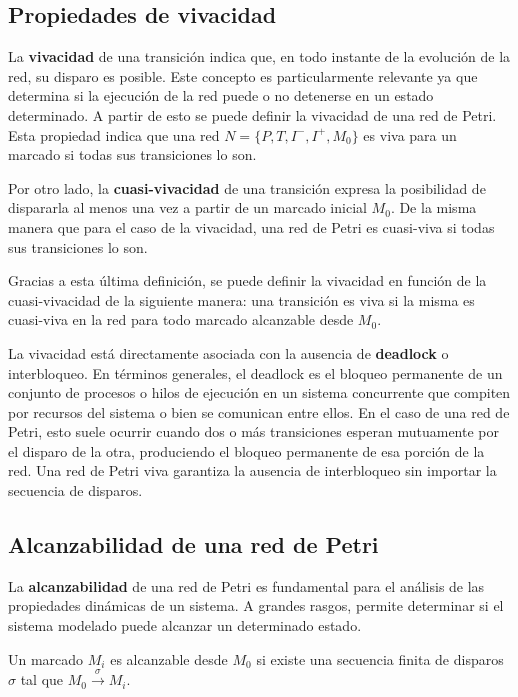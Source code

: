 \subsection{Propiedades de vivacidad}
La \textbf{vivacidad} de una transición indica que, en todo instante de la  evolución de la red, su disparo es posible. Este concepto es particularmente relevante ya que determina si la ejecución de la red puede  o no detenerse en un estado determinado. A partir de esto se puede definir la vivacidad de una red de Petri. Esta propiedad indica que una red $N = \{P, T, I^- , I^+ , M_0 \}$ es viva para un marcado si todas sus transiciones lo son.

Por otro lado, la \textbf{cuasi-vivacidad} de una transición expresa la posibilidad de dispararla al menos una vez a partir de un marcado inicial $M_0$. De la misma manera que para el caso de la vivacidad, una red de Petri es cuasi-viva si todas sus transiciones lo son.

Gracias a esta última definición, se puede definir la vivacidad en función de la cuasi-vivacidad de la siguiente manera: una transición es viva si la misma es cuasi-viva en la red para todo marcado alcanzable desde $M_0$. \\ \par

\noindent La vivacidad está directamente asociada con la ausencia de \textbf{deadlock} o interbloqueo. En términos generales, el deadlock es el bloqueo permanente de un conjunto de procesos o hilos de ejecución en un sistema concurrente que compiten por recursos del sistema o bien se comunican entre ellos. En el caso de una red de Petri, esto suele ocurrir cuando dos o más transiciones esperan mutuamente por el disparo de la otra, produciendo el bloqueo permanente de esa porción de la red. 
Una red de Petri viva garantiza la ausencia de interbloqueo sin importar la secuencia de disparos.

\subsection{Alcanzabilidad de una red de Petri}
La \textbf{alcanzabilidad} de una red de Petri es fundamental para el análisis de las propiedades dinámicas de un sistema. A grandes rasgos, permite determinar si el sistema modelado puede alcanzar un determinado estado.

Un marcado $M_i$ es alcanzable desde $M_0$ si existe una secuencia finita de disparos $\sigma$ tal que $M_0 \xrightarrow{\sigma} M_i$.

